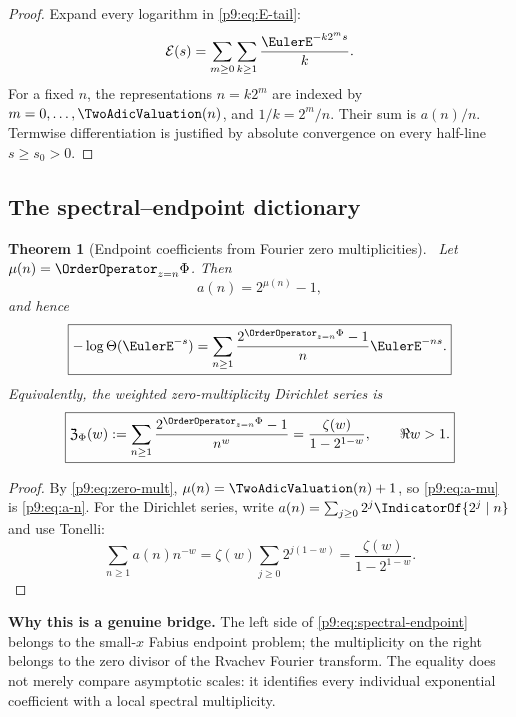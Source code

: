 \documentclass[11pt]{article}
\numberwithin{equation}{section}
\newtheorem{theorem}{Theorem}[section]
\theoremstyle{definition}
\theoremstyle{remark}
\begin{document}
\begin{proof}
Expand every logarithm in \eqref{p9:eq:E-tail}:
\[
 \mathcal E(s)=\sum_{m\ge0}\sum_{k\ge1}\frac{\EulerE^{-k2^ms}}k.
\]
For a fixed $n$, the representations $n=k2^m$ are indexed by
$m=0,\ldots,\TwoAdicValuation(n)$, and $1/k=2^m/n$.  Their sum is $a(n)/n$.
Termwise differentiation is justified by absolute convergence on every half-line
$s\ge s_0>0$.
\end{proof}

\subsection{The spectral--endpoint dictionary}

\begin{theorem}[Endpoint coefficients from Fourier zero multiplicities]
\label{p9:thm:spectral-endpoint}
\statusN\ Let $\mu(n)=\OrderOperator_{z=n}\Phi$.  Then
\begin{equation}
 a(n)=2^{\mu(n)}-1,                                        \label{p9:eq:a-mu}
\end{equation}
and hence
\begin{equation}
 \boxed{
 -\log\Theta(\EulerE^{-s})
 =\sum_{n\ge1}\frac{2^{\OrderOperator_{z=n}\Phi}-1}{n}\EulerE^{-ns}.}   \label{p9:eq:spectral-endpoint}
\end{equation}
Equivalently, the weighted zero-multiplicity Dirichlet series is
\begin{equation}
 \boxed{
 \mathfrak Z_\Phi(w):=
 \sum_{n\ge1}\frac{2^{\OrderOperator_{z=n}\Phi}-1}{n^w}
 =\frac{\zeta(w)}{1-2^{1-w}},\qquad \Re w>1.}             \label{p9:eq:weighted-zero-zeta}
\end{equation}
\end{theorem}

\begin{proof}
By \eqref{p9:eq:zero-mult}, $\mu(n)=\TwoAdicValuation(n)+1$, so \eqref{p9:eq:a-mu} is
\eqref{p9:eq:a-n}.  For the Dirichlet series, write
$a(n)=\sum_{j\ge0}2^j\IndicatorOf{2^j\mid n}$ and use Tonelli:
\[
 \sum_{n\ge1}a(n)n^{-w}
 =\zeta(w)\sum_{j\ge0}2^{j(1-w)}
 =\frac{\zeta(w)}{1-2^{1-w}}.
\]
\end{proof}

\begin{boxedremark}
\textbf{Why this is a genuine bridge.}
The left side of \eqref{p9:eq:spectral-endpoint} belongs to the small-$x$ Fabius endpoint
problem; the multiplicity on the right belongs to the zero divisor of the Rvachev Fourier
transform.  The equality does not merely compare asymptotic scales: it identifies every
individual exponential coefficient with a local spectral multiplicity.
\end{boxedremark}
\end{document}
